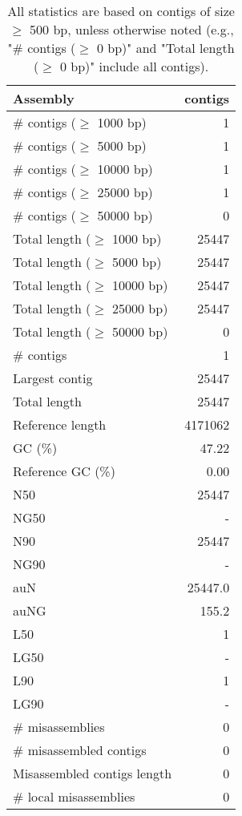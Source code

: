 \documentclass[12pt,a4paper]{article}
\begin{document}
\begin{table}[ht]
\begin{center}
\caption{All statistics are based on contigs of size $\geq$ 500 bp, unless otherwise noted (e.g., "\# contigs ($\geq$ 0 bp)" and "Total length ($\geq$ 0 bp)" include all contigs).}
\begin{tabular}{|l*{1}{|r}|}
\hline
Assembly & contigs \\ \hline
\# contigs ($\geq$ 1000 bp) & 1 \\ \hline
\# contigs ($\geq$ 5000 bp) & 1 \\ \hline
\# contigs ($\geq$ 10000 bp) & 1 \\ \hline
\# contigs ($\geq$ 25000 bp) & 1 \\ \hline
\# contigs ($\geq$ 50000 bp) & 0 \\ \hline
Total length ($\geq$ 1000 bp) & 25447 \\ \hline
Total length ($\geq$ 5000 bp) & 25447 \\ \hline
Total length ($\geq$ 10000 bp) & 25447 \\ \hline
Total length ($\geq$ 25000 bp) & 25447 \\ \hline
Total length ($\geq$ 50000 bp) & 0 \\ \hline
\# contigs & 1 \\ \hline
Largest contig & 25447 \\ \hline
Total length & 25447 \\ \hline
Reference length & 4171062 \\ \hline
GC (\%) & 47.22 \\ \hline
Reference GC (\%) & 0.00 \\ \hline
N50 & 25447 \\ \hline
NG50 & - \\ \hline
N90 & 25447 \\ \hline
NG90 & - \\ \hline
auN & 25447.0 \\ \hline
auNG & 155.2 \\ \hline
L50 & 1 \\ \hline
LG50 & - \\ \hline
L90 & 1 \\ \hline
LG90 & - \\ \hline
\# misassemblies & 0 \\ \hline
\# misassembled contigs & 0 \\ \hline
Misassembled contigs length & 0 \\ \hline
\# local misassemblies & 0 \\ \hline

\end{tabular}
\end{center}
\end{table}
\end{document}
